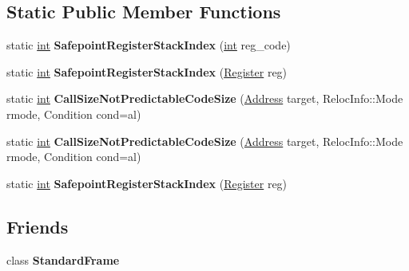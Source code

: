 \subsection*{Static Public Member Functions}
\begin{DoxyCompactItemize}
\item 
\mbox{\label{classv8_1_1internal_1_1MacroAssembler_a59648d6ea86d2b04c1ed1f52cea74f05}} 
static \mbox{\hyperlink{classint}{int}} {\bfseries Safepoint\+Register\+Stack\+Index} (\mbox{\hyperlink{classint}{int}} reg\+\_\+code)
\item 
\mbox{\label{classv8_1_1internal_1_1MacroAssembler_af7167db4295b69cf0103273a591c2137}} 
static \mbox{\hyperlink{classint}{int}} {\bfseries Safepoint\+Register\+Stack\+Index} (\mbox{\hyperlink{classv8_1_1internal_1_1Register}{Register}} reg)
\item 
\mbox{\label{classv8_1_1internal_1_1MacroAssembler_a29bb4028e4d808d2ec14f4512ceead5e}} 
static \mbox{\hyperlink{classint}{int}} {\bfseries Call\+Size\+Not\+Predictable\+Code\+Size} (\mbox{\hyperlink{classuintptr__t}{Address}} target, Reloc\+Info\+::\+Mode rmode, Condition cond=al)
\item 
\mbox{\label{classv8_1_1internal_1_1MacroAssembler_a29bb4028e4d808d2ec14f4512ceead5e}} 
static \mbox{\hyperlink{classint}{int}} {\bfseries Call\+Size\+Not\+Predictable\+Code\+Size} (\mbox{\hyperlink{classuintptr__t}{Address}} target, Reloc\+Info\+::\+Mode rmode, Condition cond=al)
\item 
\mbox{\label{classv8_1_1internal_1_1MacroAssembler_af7167db4295b69cf0103273a591c2137}} 
static \mbox{\hyperlink{classint}{int}} {\bfseries Safepoint\+Register\+Stack\+Index} (\mbox{\hyperlink{classv8_1_1internal_1_1Register}{Register}} reg)
\end{DoxyCompactItemize}
\subsection*{Friends}
\begin{DoxyCompactItemize}
\item 
\mbox{\label{classv8_1_1internal_1_1MacroAssembler_a0c4a972427da6359c680805eb847c6db}} 
class {\bfseries Standard\+Frame}
\end{DoxyCompactItemize}
